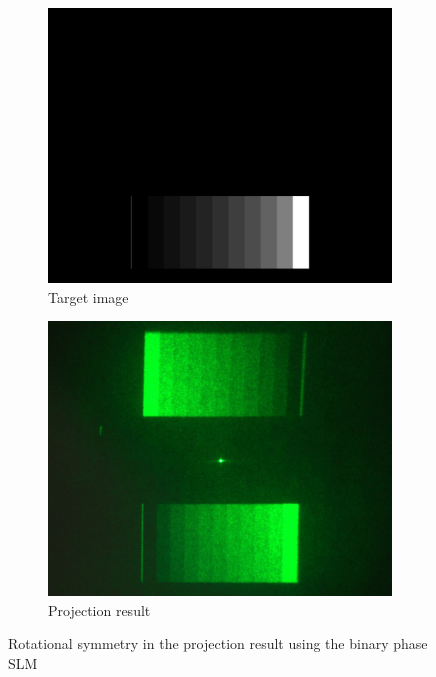 \begin{figure}[H]
  \centering
  \begin{subfigure}[t]{0.45\textwidth}
    \centering
    \includegraphics[width=\textwidth]{10_step_target.jpg}
    \caption{Target image}
    \label{fig:10_step_target}
  \end{subfigure}
  \hfill
  \begin{subfigure}[t]{0.45\textwidth}
    \centering
    \includegraphics[width=\textwidth]{binary_phase_SLM_symmetry.jpg}
    \caption{Projection result}
    \label{fig:binary_phase_SLM_symmetry}
  \end{subfigure}

  \caption{Rotational symmetry in the projection result using the binary phase SLM}
  \label{fig:Rotational symmetry Binary SLM}
\end{figure}

